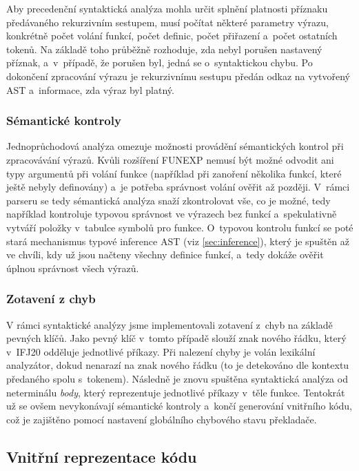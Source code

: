 \documentclass[11pt]{article}
\begin{document}
Aby precedenční syntaktická analýza mohla určit splnění platnosti příznaku předávaného rekurzivním sestupem, musí počítat některé parametry výrazu, konkrétně počet volání funkcí, počet definic, počet přiřazení a~počet ostatních tokenů. Na základě toho průběžně rozhoduje, zda nebyl porušen nastavený příznak, a~v~případě, že porušen byl, jedná se o~syntaktickou chybu. Po dokončení zpracování výrazu je rekurzivnímu sestupu předán odkaz na vytvořený AST a~informace, zda výraz byl platný.

\subsubsection{Sémantické kontroly}

Jednoprůchodová analýza omezuje možnosti provádění sémantických kontrol při zpracovávání výrazů. Kvůli rozšíření FUNEXP nemusí být možné odvodit ani typy argumentů při volání funkce (například při zanoření několika funkcí, které ještě nebyly definovány) a~je potřeba správnost volání ověřit až později. V~rámci parseru se tedy sémantická analýza snaží zkontrolovat vše, co je možné, tedy například kontroluje typovou správnost ve výrazech bez funkcí a~spekulativně vytváří položky v~tabulce symbolů pro funkce. O~typovou kontrolu funkcí se poté stará mechanismus typové inference AST (viz \ref{sec:inference}), který je spuštěn až ve chvíli, kdy už jsou načteny všechny definice funkcí, a~tedy dokáže ověřit úplnou správnost všech výrazů.

\subsubsection{Zotavení z chyb}

V rámci syntaktické analýzy jsme implementovali zotavení z~chyb na základě pevných klíčů. Jako pevný klíč v~tomto případě slouží znak nového řádku, který v~IFJ20 odděluje jednotlivé příkazy. Při nalezení chyby je volán lexikální analyzátor, dokud nenarazí na znak nového řádku (to je detekováno dle kontextu předaného spolu s~tokenem). Následně je znovu spuštěna syntaktická analýza od neterminálu \textit{body}, který reprezentuje jednotlivé příkazy v~těle funkce. Tentokrát už se ovšem nevykonávají sémantické kontroly a~končí generování vnitřního kódu, což je zajištěno pomocí nastavení globálního chybového stavu překladače.

\subsection{Vnitřní reprezentace kódu}
\end{document}

